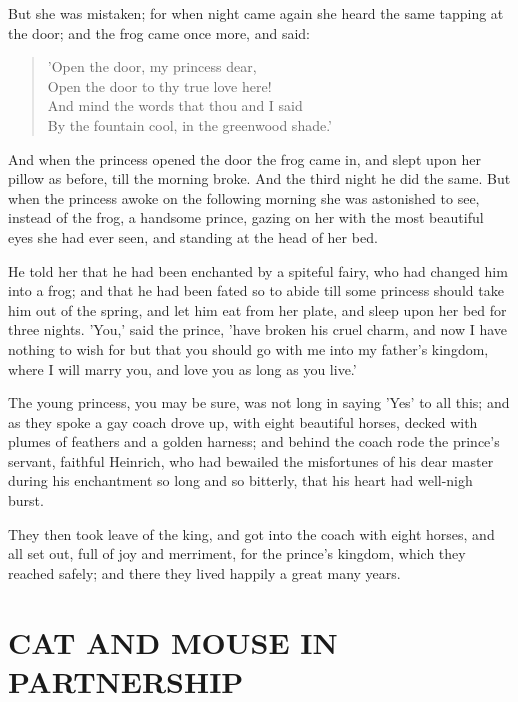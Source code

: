 \documentclass[12pt]{book}
\begin{document}
But she was mistaken; for when night came again she heard the same
tapping at the door; and the frog came once more, and said:

\begin{verse}
 'Open the door, my princess dear,\\
  Open the door to thy true love here!\\
  And mind the words that thou and I said\\
  By the fountain cool, in the greenwood shade.'
\end{verse}

And when the princess opened the door the frog came in, and slept upon
her pillow as before, till the morning broke. And the third night he
did the same. But when the princess awoke on the following morning she
was astonished to see, instead of the frog, a handsome prince, gazing
on her with the most beautiful eyes she had ever seen, and standing at
the head of her bed.

He told her that he had been enchanted by a spiteful fairy, who had
changed him into a frog; and that he had been fated so to abide till
some princess should take him out of the spring, and let him eat from
her plate, and sleep upon her bed for three nights. 'You,' said the
prince, 'have broken his cruel charm, and now I have nothing to wish
for but that you should go with me into my father's kingdom, where I
will marry you, and love you as long as you live.'

The young princess, you may be sure, was not long in saying 'Yes' to
all this; and as they spoke a gay coach drove up, with eight beautiful
horses, decked with plumes of feathers and a golden harness; and
behind the coach rode the prince's servant, faithful Heinrich, who had
bewailed the misfortunes of his dear master during his enchantment so
long and so bitterly, that his heart had well-nigh burst.

They then took leave of the king, and got into the coach with eight
horses, and all set out, full of joy and merriment, for the prince's
kingdom, which they reached safely; and there they lived happily a
great many years.



\chapter{CAT AND MOUSE IN PARTNERSHIP}
\end{document}
